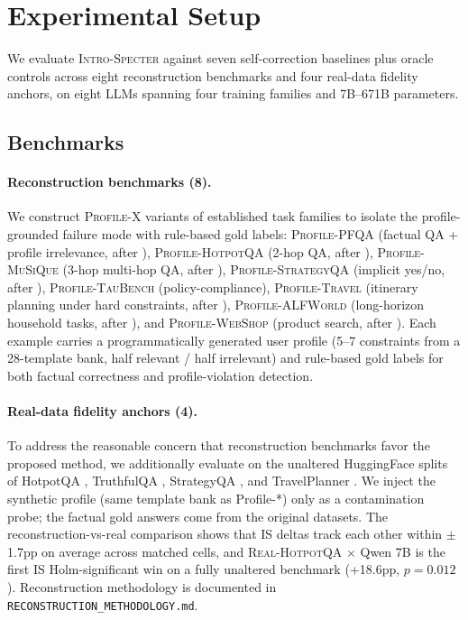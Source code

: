 \section{Experimental Setup}
\label{sec:setup}

We evaluate \textsc{Intro-Specter} against seven self-correction
baselines plus oracle controls across eight reconstruction benchmarks
and four real-data fidelity anchors, on eight LLMs spanning four
training families and 7B--671B parameters.

\subsection{Benchmarks}
\label{sec:benchmarks}

\paragraph{Reconstruction benchmarks (8).} We construct
\textsc{Profile-X} variants of established task families to isolate
the profile-grounded failure mode with rule-based gold labels:
\textsc{Profile-PFQA} (factual QA + profile irrelevance, after
\citealp{sun2026personalization}), \textsc{Profile-HotpotQA} (2-hop
QA, after \citealp{yang2018hotpotqa}), \textsc{Profile-MuSiQue}
(3-hop multi-hop QA, after \citealp{trivedi2022musique}),
\textsc{Profile-StrategyQA} (implicit yes/no, after
\citealp{geva2021strategyqa}), \textsc{Profile-TauBench}
(policy-compliance), \textsc{Profile-Travel} (itinerary planning
under hard constraints, after \citealp{singh2024travelplanner}),
\textsc{Profile-ALFWorld} (long-horizon household tasks, after
\citealp{shridhar2021alfworld}), and \textsc{Profile-WebShop}
(product search, after \citealp{yao2022webshop}). Each example
carries a programmatically generated user profile (5--7
constraints from a 28-template bank, half relevant / half
irrelevant) and rule-based gold labels for both factual
correctness and profile-violation detection.

\paragraph{Real-data fidelity anchors (4).} To address the
reasonable concern that reconstruction benchmarks favor the
proposed method, we additionally evaluate on the unaltered
HuggingFace splits of HotpotQA \citep{yang2018hotpotqa},
TruthfulQA \citep{lin2022truthfulqa}, StrategyQA
\citep{geva2021strategyqa}, and TravelPlanner
\citep{singh2024travelplanner}. We inject the synthetic profile
(same template bank as Profile-*) only as a contamination probe;
the factual gold answers come from the original datasets. The
reconstruction-vs-real comparison shows that IS deltas track each
other within $\pm$1.7pp on average across matched cells, and
\textsc{Real-HotpotQA} $\times$ Qwen 7B is the first IS
Holm-significant win on a fully unaltered benchmark
(+18.6pp, $p=0.012$). Reconstruction methodology is documented in
\texttt{RECONSTRUCTION\_METHODOLOGY.md}.


